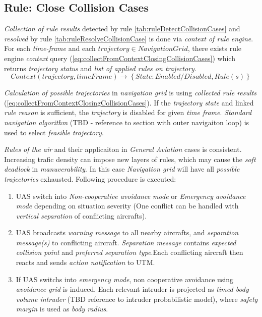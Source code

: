 \subsection{Rule: Close Collision Cases}\label{sec:ruleCloseCollisionCases}    
    \noindent\emph{Collection of rule results} detected by rule \ref{tab:ruleDetectCollisionCases} and \emph{resolved} by rule \ref{tab:ruleResolveCollisionCase} is done via \emph{context of rule engine}. For each \emph{time-frame} and each $trajectory\in NavigationGrid$, there exists rule engine \emph{context} query (\ref{eq:collectFromContextClosingCollisionCases}) which returns \emph{trajectory status} and \emph{list of applied rules on trajectory}.
    \begin{equation}\label{eq:collectFromContextClosingCollisionCases}
        Context(trajectory,timeFrame) \to \left\{State: Enabled/Disabled, Rule(s)\right\}
    \end{equation}
    
    \emph{Calculation of possible trajectories} in \emph{navigation grid} is using \emph{collected rule results} (\ref{eq:collectFromContextClosingCollisionCases}). If the \emph{trajectory state} and linked \emph{rule reason} is sufficient, the \emph{trajectory} is disabled for given \emph{time frame}. \emph{Standard navigation algorithm} (TBD - reference to section with outer navigaiton loop) is used to select \emph{feasible trajectory}. 
    
    \emph{Rules of the air} and their applicaiton in \emph{General Aviation} cases is consistent. Increasing trafic density can impose new layers of rules, which may cause the \emph{soft deadlock} in \emph{manuverability}. In this case \emph{Navigation grid} will have all  \emph{possible trajectories} exhausted. Following procedure is executed:
    \begin{enumerate}
        \item UAS switch into \emph{Non-cooperative avoidance mode} or \emph{Emergency avoidance mode} depending on situation severity (One conflict can be handled with \emph{vertical separation} of conflicting aircrafts).
        \item UAS broadcasts \emph{warning message} to all nearby aircrafts, and \emph{separation message(s)} to conflicting aircraft. \emph{Separation message} contains \emph{expected collision point} and \emph{preferred separation type}.Each conflicting aircraft then reacts and sends \emph{action notification} to UTM.
        \item If UAS switchs into \emph{emergency mode}, non cooperative avoidance using \emph{avoidance grid} is induced. Each relevant intruder is projected as \emph{timed body volume intruder} (TBD reference to intruder probabilistic model), where \emph{safety margin} is used as \emph{body radius}.
    \end{enumerate}
    
